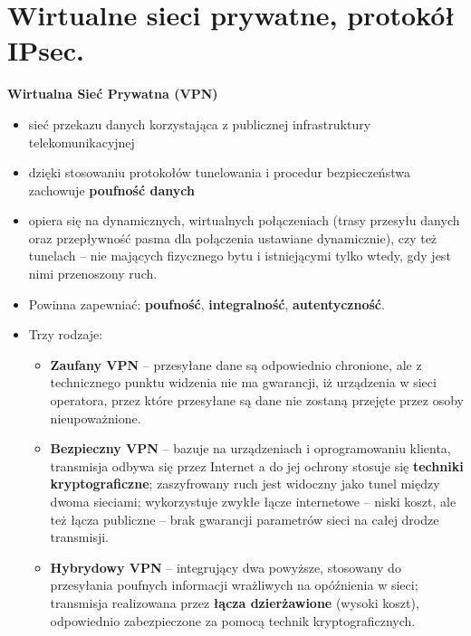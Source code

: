 \documentclass[main.tex]{subfiles}
\begin{document}
    \section{Wirtualne sieci prywatne, protokół IPsec.}
    \textbf{Wirtualna Sieć Prywatna (VPN)}
    \begin{itemize}[noitemsep]
        \item sieć przekazu danych korzystająca z publicznej infrastruktury telekomunikacyjnej
        \item dzięki stosowaniu protokołów tunelowania i procedur bezpieczeństwa zachowuje \textbf{poufność danych}
        \item opiera się na dynamicznych, wirtualnych połączeniach (trasy przesyłu danych oraz przepływność pasma dla połączenia
        ustawiane dynamicznie), czy też tunelach – nie mających fizycznego bytu i istniejącymi tylko wtedy, gdy jest nimi
        przenoszony ruch.
        \item Powinna zapewniać: \textbf{poufność}, \textbf{integralność}, \textbf{autentyczność}.

        \item Trzy rodzaje:
        \begin{itemize}
            \item \textbf{Zaufany VPN} -- przesyłane dane są odpowiednio chronione, ale z technicznego punktu
            widzenia nie ma gwarancji, iż urządzenia w sieci operatora, przez które przesyłane są dane nie zostaną
            przejęte przez osoby nieupoważnione.

            \item \textbf{Bezpieczny VPN} -- bazuje na urządzeniach i oprogramowaniu klienta, transmisja odbywa się
            przez Internet a do jej ochrony stosuje się \textbf{techniki kryptograficzne}; zaszyfrowany ruch jest
            widoczny jako tunel między dwoma sieciami; wykorzystuje zwykłe łącze internetowe -- niski koszt, ale
            też łącza publiczne -- brak gwarancji parametrów sieci na całej drodze transmisji.

            \item \textbf{Hybrydowy VPN} -- integrujący dwa powyższe, stosowany do przesyłania poufnych informacji
            wrażliwych na opóźnienia w sieci; transmisja realizowana przez \textbf{łącza dzierżawione} (wysoki koszt),
            odpowiednio zabezpieczone za pomocą technik kryptograficznych.
        \end{itemize}


\end{itemize}
\end{document}
